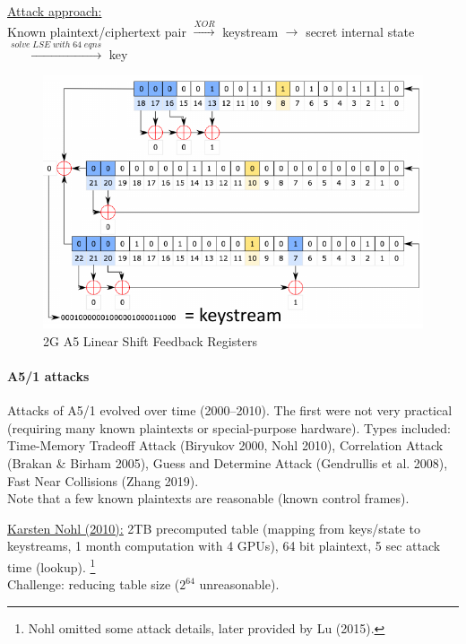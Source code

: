 \underline{Attack approach:} \\
Known plaintext/ciphertext pair
$\overset{XOR}{\longrightarrow}$ keystream
$\longrightarrow$ secret internal state
$\overset{solve\; LSE\; with\; 64\; eqns}{\longrightarrow}$ key

\begin{figure}
	\centering
	\includegraphics[scale=0.5]{images/10-2g-a5.png}
	\caption{2G A5 Linear Shift Feedback Registers}
	\label{fig:2g-a5}
\end{figure}

\paragraph{A5/1 attacks}
Attacks of A5/1 evolved over time (2000--2010).
The first were not very practical (requiring many known plaintexts or special-purpose hardware).
Types included: Time-Memory Tradeoff Attack (Biryukov 2000, Nohl 2010), Correlation Attack (Brakan \& Birham 2005), Guess and Determine Attack (Gendrullis et al. 2008), Fast Near Collisions (Zhang 2019).
\\
Note that a few known plaintexts are reasonable (known control frames).

\href{https://media.blackhat.com/bh-us-10/whitepapers/Nohl/BlackHat-USA-2010-Nohl-Attacking.Phone.Privacy-wp.pdf}{\underline{Karsten Nohl (2010):}}
2TB precomputed table (mapping from keys/state to keystreams, 1 month computation with 4 GPUs), 64 bit plaintext, 5 sec attack time (lookup).%
\footnote{Nohl omitted some attack details, later provided by Lu (2015).}
\\
Challenge: reducing table size ($2^{64}$ unreasonable).

